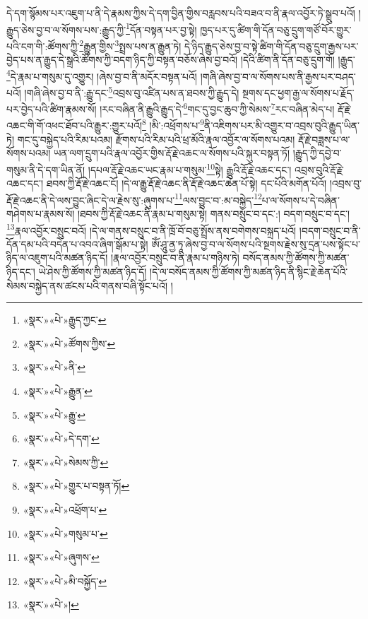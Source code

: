 དེ་དག་སྙོམས་པར་འཇུག་པ་ནི་དེ་རྣམས་ཀྱིས་དེ་དག་བྱིན་གྱིས་བརླབས་པའི་བཟའ་བ་ནི་རྣལ་འབྱོར་ཏེ་སྒྲུབ་པའོ། །རྒྱུད་ཅེས་བྱ་བ་ལ་སོགས་པས་:རྒྱུད་ཀྱི་\footnote{«སྣར་»«པེ་»རྒྱུད་ཀྱང་}དོན་བསྟན་པར་བྱ་སྟེ། ཁྱད་པར་དུ་ཚིག་གི་དོན་བཅུ་དྲུག་གཙོ་བོར་གྱུར་པའི་ངག་གི་:ཚོགས་ཀྱི་\footnote{«སྣར་»«པེ་»ཚོགས་ཀྱིས་}རྒྱུན་གྱིས་\footnote{«སྣར་»«པེ་»ནི་}སྤྲས་པས་ན་རྒྱུན་ཏེ། དེ་ཉིད་རྒྱུད་ཅེས་བྱ་བ་སྟེ་ཚིག་གི་དོན་བཅུ་དྲུག་རྒྱས་པར་བྱེད་པས་ན་རྒྱུད་དེ་སྒྲའི་ཚོགས་ཀྱི་བདག་ཉིད་ཀྱི་བསྟན་བཅོས་ཞེས་བྱ་བའོ། །དེའི་ཚིག་ནི་དོན་བཅུ་དྲུག་གོ། །རྒྱུད་\footnote{«སྣར་»«པེ་»རྒྱུན་}དེ་རྣམ་པ་གསུམ་དུ་འགྱུར། །ཞེས་བྱ་བ་ནི་མདོར་བསྟན་པའོ། །གཞི་ཞེས་བྱ་བ་ལ་སོགས་པས་ནི་རྒྱས་པར་བཤད་པའོ། །གཞི་ཞེས་བྱ་བ་ནི་:རྒྱུ་དང་\footnote{«སྣར་»«པེ་»རྒྱུ་}འབྲས་བུ་འཛིན་པས་ན་ཐབས་ཀྱི་རྒྱུད་དེ། སྔགས་དང་ཕྱག་རྒྱ་ལ་སོགས་པ་རྗོད་པར་བྱེད་པའི་ཚིག་རྣམས་སོ། །རང་བཞིན་ནི་རྒྱུའི་རྒྱུད་དེ་\footnote{«སྣར་»«པེ་»དེ་དག་}གང་དུ་བྱང་ཆུབ་ཀྱི་སེམས་\footnote{«སྣར་»«པེ་»སེམས་ཀྱི་}རང་བཞིན་མེད་པ། རྡོ་རྗེ་འཆང་གི་གོ་འཕང་ཐོབ་པའི་རྒྱུར་:གྱུར་པའོ།\footnote{«སྣར་»«པེ་»གྱུར་པ་བསྟན་ཏོ།} །མི་:འཕྲོགས་པ་\footnote{«སྣར་»«པེ་»འཕྲོག་པ་}ནི་འཇིགས་པར་མི་འགྱུར་བ་འབྲས་བུའི་རྒྱུད་ཡིན་ཏེ། གང་དུ་བསྐྱེད་པའི་རིམ་པའམ། རྫོགས་པའི་རིམ་པའི་ཕྲ་མོའི་རྣལ་འབྱོར་ལ་སོགས་པའམ། རྡོ་རྗེ་བཟླས་པ་ལ་སོགས་པའམ། ཡན་ལག་དྲུག་པའི་རྣལ་འབྱོར་གྱིས་རྡོ་རྗེ་འཆང་ལ་སོགས་པའི་སྐུར་བསྟན་ཏོ། །རྒྱུད་ཀྱི་དབྱེ་བ་གསུམ་ནི་དེ་དག་ཡིན་ནོ། །དཔལ་རྡོ་རྗེ་འཆང་ཡང་རྣམ་པ་གསུམ་\footnote{«སྣར་»«པེ་»གསུམ་པ་}སྟེ། རྒྱུའི་རྡོ་རྗེ་འཆང་དང་། འབྲས་བུའི་རྡོ་རྗེ་འཆང་དང་། ཐབས་ཀྱི་རྡོ་རྗེ་འཆང་ངོ། །དེ་ལ་རྒྱུ་རྡོ་རྗེ་འཆང་ནི་རྡོ་རྗེ་འཆང་ཆེན་པོ་སྟེ། དང་པོའི་མགོན་པོའོ། །འབྲས་བུ་རྡོ་རྗེ་འཆང་ནི་དེ་ལས་བྱུང་ཞིང་དེ་ལ་རྗེས་སུ་:ཞུགས་པ་\footnote{«སྣར་»«པེ་»ཞུགས་}ལས་བྱུང་བ་:མ་བསྐྱེད་\footnote{«སྣར་»«པེ་»མི་བསྐྱོད་}པ་ལ་སོགས་པ་དེ་བཞིན་གཤེགས་པ་རྣམས་སོ། །ཐབས་ཀྱི་རྡོ་རྗེ་འཆང་ནི་རྣམ་པ་གསུམ་སྟེ། གནས་བསྲུང་བ་དང་:། བདག་བསྲུང་བ་དང་། \footnote{«སྣར་»«པེ་»།  }རྣལ་འབྱོར་བསྲུང་བའོ། །དེ་ལ་གནས་བསྲུང་བ་ནི་ཁྲོ་བོ་བཅུ་སྤྲོས་ནས་བགེགས་བསྐྲད་པའོ། །བདག་བསྲུང་བ་ནི་དོན་དམ་པའི་བདེན་པ་འབའ་ཞིག་སྒོམ་པ་སྟེ། ཨོཾ་ཤཱུ་ནྱ་ཏཱ་ཞེས་བྱ་བ་ལ་སོགས་པའི་སྔགས་རྗེས་སུ་དྲན་པས་སྟོང་པ་ཉིད་ལ་འཇུག་པའི་མཚན་ཉིད་དོ། །རྣལ་འབྱོར་བསྲུང་བ་ནི་རྣམ་པ་གཉིས་ཏེ། བསོད་ནམས་ཀྱི་ཚོགས་ཀྱི་མཚན་ཉིད་དང་། ཡེ་ཤེས་ཀྱི་ཚོགས་ཀྱི་མཚན་ཉིད་དོ། །དེ་ལ་བསོད་ནམས་ཀྱི་ཚོགས་ཀྱི་མཚན་ཉིད་ནི་སྙིང་རྗེ་ཆེན་པོའི་སེམས་བསྐྱེད་ནས་ཚངས་པའི་གནས་བཞི་སྟོང་པའོ། །
